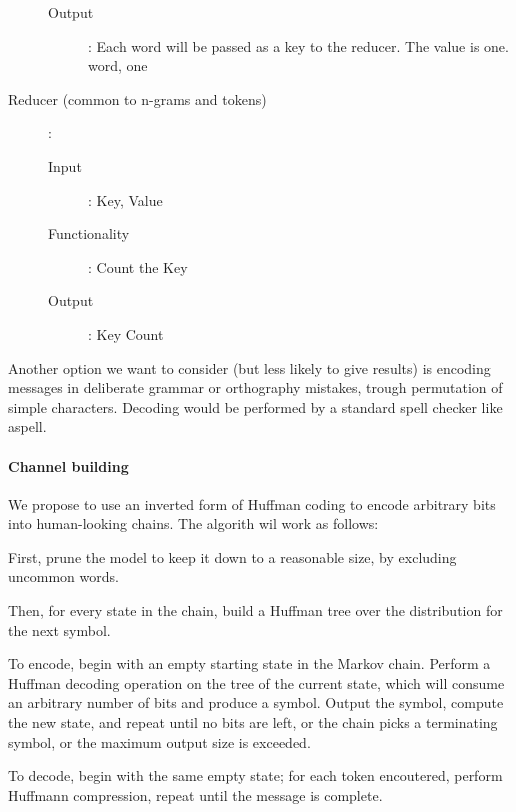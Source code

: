 \documentclass[a4paper,11pt]{article}
\begin{document}
\begin{flushleft}
\begin{description}
\begin{description}
\item[Output]: Each word will be passed as a key to the reducer. The value is one. 
		{word, one}
			
\end{description}
	
\item[Reducer (common to n-grams and tokens)]:

\begin{description}
\item[Input]: {Key, Value}

\item[Functionality]: Count the Key

\item[Output]: Key Count
\end{description}

\end{description}
 
\end{flushleft}

Another option we want to consider (but less likely to give results) is encoding messages in deliberate grammar or orthography mistakes, trough permutation of simple characters. Decoding would be performed by a standard spell checker like aspell.

\paragraph{Channel building}

We propose to use an inverted form of Huffman coding to encode arbitrary bits into human-looking chains. The algorith wil work as follows:

First, prune the model to keep it down to a reasonable size, by excluding uncommon words.

Then, for every state in the chain, build a Huffman tree over the distribution for the next symbol.

To encode, begin with an empty starting state in the Markov chain. Perform a Huffman decoding operation on the tree of the current state, which will consume an arbitrary number of bits and produce a symbol. Output the symbol, compute the new state, and repeat until no bits are left, or the chain picks a terminating symbol, or the maximum output size is exceeded.

To decode, begin with the same empty state; for each token encoutered, perform Huffmann compression, repeat until the message is complete.
\end{document}
